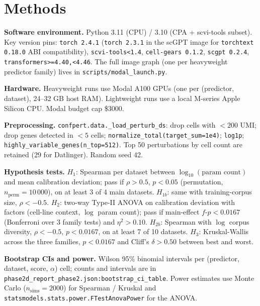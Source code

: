 \documentclass{article}
\begin{document}



\appendix

\section{Methods}
\label{sec:methods-app}
\sloppy

\noindent\textbf{Software environment.}
Python 3.11 (CPU) / 3.10 (CPA + scvi-tools subset). Key version pins:
\texttt{torch 2.4.1} (\texttt{torch 2.3.1} in the scGPT image for
\texttt{torchtext 0.18.0} ABI compatibility),
\texttt{scvi-tools<1.4}, \texttt{cell-gears 0.1.2},
\texttt{scgpt 0.2.4}, \texttt{transformers>=4.40,<4.46}. The full
image graph (one per heavyweight predictor family) lives in
\texttt{scripts/modal\_launch.py}.

\noindent\textbf{Hardware.}
Heavyweight runs use Modal A100 GPUs (one per (predictor, dataset),
24--32 GB host RAM). Lightweight runs use a local M-series Apple
Silicon CPU. Modal budget cap \$3000.

\noindent\textbf{Preprocessing.}
\texttt{confpert.data.\_load\_perturb\_ds}: drop cells with $<200$
UMI; drop genes detected in $<5$ cells;
\texttt{normalize\_total(target\_sum=1e4)}; \texttt{log1p};
\texttt{highly\_variable\_genes(n\_top=512)}. Top 50 perturbations
by cell count are retained (29 for Datlinger). Random seed 42.

\noindent\textbf{Hypothesis tests.}
$H_1$: Spearman per dataset between $\log_{10}(\text{param count})$
and mean calibration deviation; pass if $\rho > 0.5$, $p < 0.05$
(permutation, $n_\text{perm} = 10\,000$), on at least 3 of 4 main
datasets. $H_{1b}$: same with training-corpus size, $\rho < -0.5$.
$H_2$: two-way Type-II ANOVA on calibration deviation with factors
(cell-line context, $\log$ param count); pass if main-effect
$f\text{-}p < 0.0167$ (Bonferroni over 3 family tests) and
$\eta^2 > 0.10$. $H_{2b}$: Spearman with $\log$ corpus diversity,
$\rho < -0.5$, $p < 0.0167$, on at least 7 of 10 datasets.
$H_3$: Kruskal-Wallis across the three families, $p < 0.0167$ and
Cliff's $\delta > 0.50$ between best and worst.

\noindent\textbf{Bootstrap CIs and power.}
Wilson 95\% binomial intervals per (predictor, dataset, score,
$\alpha$) cell; counts and intervals are in
\texttt{phase2d\_report\_phase2.json:bootstrap\_ci\_table}. Power
estimates use Monte Carlo ($n_\text{sims} = 2000$) for Spearman /
Kruskal and \texttt{statsmodels.stats.power.FTestAnovaPower} for
the ANOVA.
\end{document}
